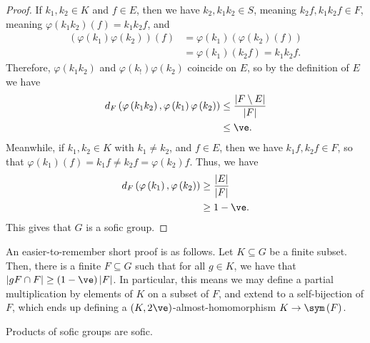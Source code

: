 \documentclass[10pt]{mypackage}
\begin{document}
\begin{proof}
  If $k_1,k_2\in K$ and $f\in E$, then we have $k_2,k_1k_2\in S$, meaning $k_2f,k_1k_2f\in F$, meaning $\varphi\left( k_1k_2 \right)(f) = k_1k_2f$, and 
  \begin{align*}
    \left( \varphi\left( k_1 \right)\varphi\left( k_2 \right) \right)(f) &= \varphi\left( k_1 \right)\left( \varphi\left( k_2 \right)(f) \right)\\
                                                                         &= \varphi\left( k_1 \right)\left( k_2f \right) = k_1k_2f.
  \end{align*}
  Therefore, $\varphi\left( k_1k_2 \right)$ and $\varphi\left( k_! \right)\varphi\left( k_2 \right)$ coincide on $E$, so by the definition of $E$ we have
  \begin{align*}
    d_F\left( \varphi\left( k_1k_2 \right),\varphi\left( k_1 \right)\varphi\left( k_2 \right) \right) &\leq \frac{\left\vert F\setminus E \right\vert}{\left\vert F \right\vert}\\
                                          &\leq \ve.
  \end{align*}
  Meanwhile, if $k_1,k_2\in K$ with $k_1\neq k_2$, and $f\in E$, then we have $k_1f,k_2f\in F$, so that $\varphi\left( k_1 \right)(f) = k_1f\neq k_2f = \varphi\left( k_2 \right)f$. Thus, we have
  \begin{align*}
    d_F\left( \varphi\left( k_1 \right),\varphi\left( k_2 \right) \right) &\geq \frac{\left\vert E \right\vert}{\left\vert F \right\vert}\\
                                                                          &\geq 1-\ve.
  \end{align*}
  This gives that $G$ is a sofic group.
\end{proof}
\begin{remark}
  An easier-to-remember short proof is as follows. Let $K\subseteq G$ be a finite subset. Then, there is a finite $F\subseteq G$ such that for all $g\in K$, we have that $\left\vert gF\cap F \right\vert\geq \left( 1-\ve \right)\left\vert F \right\vert$. In particular, this means we may define a partial multiplication by elements of $K$ on a subset of $F$, and extend to a self-bijection of $F$, which ends up defining a $\left( K,2\ve \right)$-almost-homomorphism $K\to \sym\left( F \right)$.
\end{remark}
\begin{proposition}
  Products of sofic groups are sofic.
\end{proposition}
\end{document}
